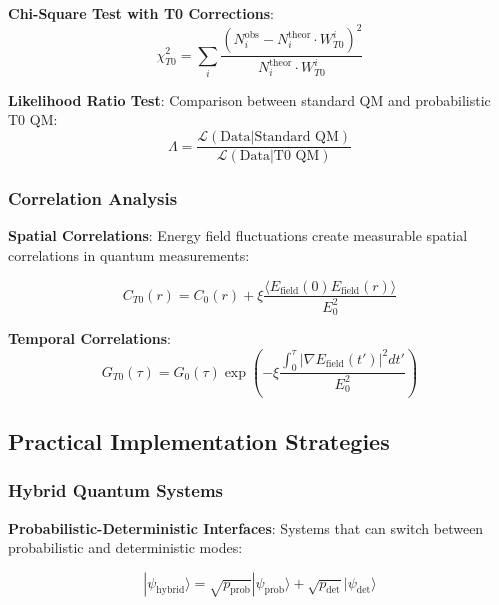\documentclass[12pt,a4paper]{article}
\newcommand{\xipar}{\xi}
\theoremstyle{definition}
\theoremstyle{remark}
\begin{document}
\textbf{Chi-Square Test with T0 Corrections}:
\begin{equation}
	\chi_{T0}^2 = \sum_i \frac{(N_i^{\text{obs}} - N_i^{\text{theor}} \cdot W_{T0}^i)^2}{N_i^{\text{theor}} \cdot W_{T0}^i}
	\label{eq:chi_square_t0_en}
\end{equation}

\textbf{Likelihood Ratio Test}:
Comparison between standard QM and probabilistic T0 QM:
\begin{equation}
	\Lambda = \frac{\mathcal{L}(\text{Data}|\text{Standard QM})}{\mathcal{L}(\text{Data}|\text{T0 QM})}
	\label{eq:likelihood_ratio_en}
\end{equation}

\subsubsection{Correlation Analysis}

\textbf{Spatial Correlations}:
Energy field fluctuations create measurable spatial correlations in quantum measurements:

\begin{equation}
	C_{T0}(r) = C_0(r) + \xipar \frac{\langle E_{\text{field}}(0) E_{\text{field}}(r) \rangle}{E_0^2}
	\label{eq:spatial_correlations_en}
\end{equation}

\textbf{Temporal Correlations}:
\begin{equation}
	G_{T0}(\tau) = G_0(\tau) \exp\left(-\xipar \frac{\int_0^\tau |\nabla E_{\text{field}}(t')|^2 dt'}{E_0^2}\right)
	\label{eq:temporal_correlations_en}
\end{equation}

\subsection{Practical Implementation Strategies}

\subsubsection{Hybrid Quantum Systems}

\textbf{Probabilistic-Deterministic Interfaces}:
Systems that can switch between probabilistic and deterministic modes:

\begin{equation}
	|\psi_{\text{hybrid}}\rangle = \sqrt{p_{\text{prob}}} |\psi_{\text{prob}}\rangle + \sqrt{p_{\text{det}}} |\psi_{\text{det}}\rangle
	\label{eq:hybrid_states_en}
\end{equation}
\end{document}
